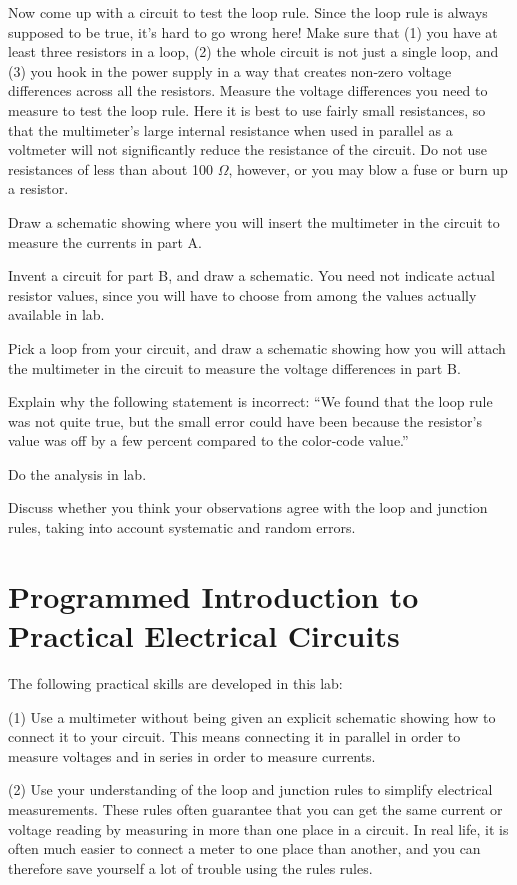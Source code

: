

Now come up with a circuit to test the loop rule. Since the
loop rule is always supposed to be true, it's hard to go
wrong here! Make sure that (1) you have at least three resistors in a
loop, (2) the whole circuit is not just a single loop,
and (3) you hook in the power supply in a way
that creates non-zero voltage differences across all the
resistors. Measure the voltage differences you need to
measure to test the loop rule. Here it is best to use fairly
small resistances, so that the multimeter's large internal
resistance when used in parallel as a voltmeter will not
significantly reduce the resistance of the circuit. Do not
use resistances of less than about 100 $\Omega $, however,
or you may blow a fuse or burn up a resistor.

\prelab

\prelabquestion  Draw a schematic showing where you will insert the
multimeter in the circuit to measure the currents in part A.

\prelabquestion  Invent a circuit for part B, and draw a schematic. You
need not indicate actual resistor values, since you will
have to choose from among the values actually available in lab.

\prelabquestion  Pick a loop from your circuit, and
draw a schematic showing how you will attach the
multimeter in the circuit to measure the voltage differences in part B.

\prelabquestion  Explain why the following statement is incorrect: ``We
found that the loop rule was not quite true, but the small
error could have been because the resistor's value was off
by a few percent compared to the color-code value.''

\selfcheck

Do the analysis in lab.

\analysis

Discuss whether you think your observations agree with
the loop and junction rules, taking into account systematic and random errors.

\section*{Programmed Introduction to Practical Electrical Circuits}

The following practical skills are developed in this lab:

(1) Use a multimeter without being given an explicit
schematic showing how to connect it to your circuit. This
means connecting it in parallel in order to measure voltages
and in series in order to measure currents.

(2) Use your understanding of the loop and junction rules to simplify
electrical measurements. These rules often guarantee
that you can get the same current or voltage reading by
measuring in more than one place in a circuit. In real life,
it is often much easier to connect a meter to one place than
another, and you can therefore save yourself a lot of
trouble using the rules rules.
